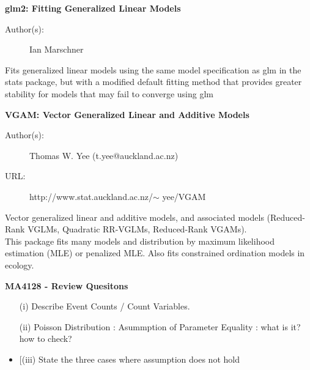 \documentclass[MASTER.tex]{subfiles}
\begin{document}
\begin{frame}
	\textbf{glm2: Fitting Generalized Linear Models}
\begin{description}
	\item[Author(s):] Ian Marschner 

\end{description}
Fits generalized linear models using the same model specification as glm in the stats package, but with a modified default fitting method that provides greater stability for models that may fail to converge using glm
\end{frame}
\begin{frame}
	\textbf{VGAM: Vector Generalized Linear and Additive Models}
\begin{description}
\item[Author(s):] Thomas W. Yee (t.yee@auckland.ac.nz)
\item[URL:] http://www.stat.auckland.ac.nz/$\sim$ yee/VGAM
\end{description}\bigskip
Vector generalized linear and additive models, and associated models (Reduced-Rank VGLMs, Quadratic RR-VGLMs, Reduced-Rank VGAMs). \\ \bigskip This package fits many models and distribution by maximum likelihood estimation (MLE) or penalized MLE. Also fits constrained ordination models in ecology.
\end{frame}
\begin{frame}
\noindent \textbf{MA4128   - Review Quesitons}
\begin{itemize}
\item[(i)] Describe Event Counts / Count Variables.
\item[(ii)] Poisson Distribution : Asummption of Parameter Equality : what is it? how to check?

\item[(iii) State the three cases where assumption does not hold

\end{itemize}
\end{frame}
\end{document}
